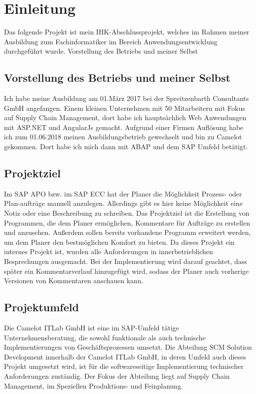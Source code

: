 \section{Einleitung}
\label{sec:Einleitung}
	Das folgende Projekt ist mein IHK-Abschlussprojekt, welches im Rahmen meiner Ausbildung zum Fachinformatiker im Bereich Anwendungsentwicklung durchgeführt wurde.
	Vorstellung des Betriebs und meiner Selbst



\subsection{Vorstellung des Betriebs und meiner Selbst} 
\label{sec:Vorstellung des Betriebs und meiner Selbst}
	Ich habe meine Ausbildung am 01.März 2017 bei der Spreitzenbarth Consultants GmbH angefangen. Einem kleinen Unternehmen mit 50 Mitarbeitern mit Fokus auf Supply Chain Management, dort habe ich hauptsächlich Web Anwendungen mit ASP.NET und AngularJs gemacht. Aufgrund einer Firmen Auflösung habe ich zum 01.06.2018 meinen Ausbildungsbetrieb gewechselt und bin zu Camelot gekommen. Dort habe ich mich dann mit \ac{ABAP} und dem SAP Umfeld betätigt.


\subsection{Projektziel} 
\label{sec:Projektziel}
	Im SAP APO bzw. im SAP ECC hat der Planer die Möglichkeit Prozess- oder Plan-aufträge manuell anzulegen. Allerdings gibt es hier keine Möglichkeit eine Notiz oder eine Beschreibung zu schreiben. Das Projektziel ist die Erstellung von Programmen, die dem Planer ermöglichen, Kommentare	für Aufträge zu erstellen und anzusehen. Außerdem sollen bereits vorhandene Programm erweitert werden, um dem Planer den bestmöglichen Komfort zu bieten. Da dieses Projekt ein internes Projekt ist, wurden alle Anforderungen in innerbetrieblichen Besprechungen ausgemacht.  Bei der Implementierung wird darauf geachtet, dass später ein Kommentarverlauf hinzugefügt wird, sodass der Planer auch vorherige Versionen von Kommentaren anschauen kann. 


\subsection{Projektumfeld}
\label{sec:Projektumfeld}
	Die Camelot ITLab GmbH ist eine im SAP-Umfeld tätige Unternehmensberatung, die sowohl	funktionale als auch technische Implementierungen von Geschäftsprozessen umsetzt.	Die Abteilung SCM Solution Development innerhalb der Camelot ITLab GmbH, in deren Umfeld	auch dieses Projekt umgesetzt wird, ist für die softwareseitige Implementierung technischer	Anforderungen zuständig. Der Fokus der Abteilung liegt auf Supply Chain Management, im Speziellen Produktions- und Feinplanung.
	

